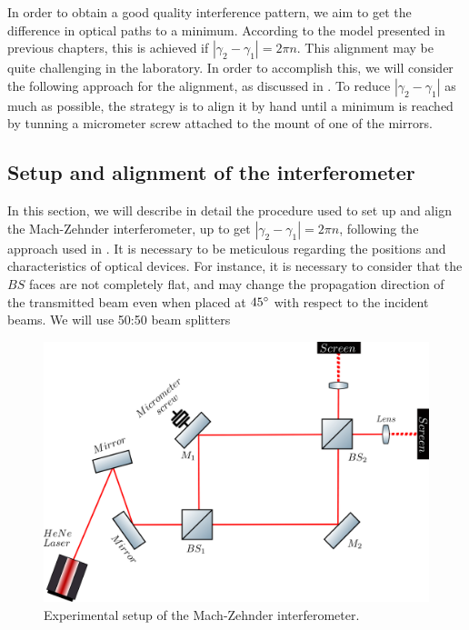 \documentclass[12pt]{book}
\begin{document}
In order to obtain a good quality interference pattern, we aim to get the difference in optical paths to a minimum. According to the model presented in previous chapters, this is achieved if $|\gamma_{2}-\gamma_{1}|=2\pi n$. This alignment may be quite challenging in the laboratory. In order to accomplish this, we will consider the following approach for the alignment, as discussed in \cite{zuri}. To reduce $|\gamma_{2}-\gamma_{1}|$ as much as possible, the strategy is to align it by hand until a minimum is reached by tunning a micrometer screw attached to the mount of one of the mirrors.



\subsection{Setup and alignment of the interferometer}

In this section, we will describe in detail the procedure used to set up and align the Mach-Zehnder interferometer, up to get $|\gamma_{2}-\gamma_{1}|=2\pi n$, following the approach used in \cite{zuri}. It is necessary to be meticulous regarding the positions and characteristics of optical devices. For instance, it is necessary to consider that the $BS$ faces are not completely flat, and may change the propagation direction of the transmitted beam even when placed at $45\degree$ with respect to the incident beams. We will use 50:50 beam splitters

\begin{figure}[t!]
\centering
\includegraphics[scale=0.4]{images/mach_sara.png}
\caption{Experimental setup of the Mach-Zehnder interferometer.}
\label{newnewsingle}
\end{figure}
\end{document}
